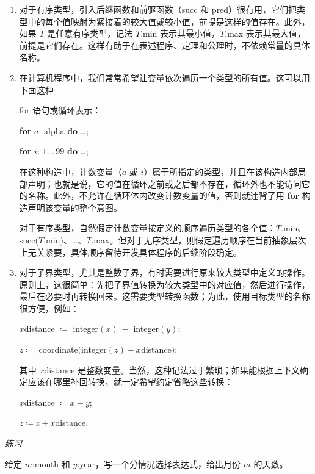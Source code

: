 \begin{enumerate}[wide, nosep, label=(\arabic*)]
	\quad \textbf{if} May $\leqslant$ this month \& this month $\leqslant$ September \textbf{then}
	
	\qquad adopt summer timetables. 
	
	\noindent
	其他情况下，值的次序完全无关，对程序员没有意义。
	
	\item 对于有序类型，引入后继函数和前驱函数（succ 和 pred）很有用，它们把类型中的每个值映射为紧接着的较大值或较小值，前提是这样的值存在。此外，如果 $T$ 是任意有序类型，记法 $T$.min 表示其最小值，$T$.max 表示其最大值，前提是它们存在。这样有助于在表述程序、定理和公理时，不依赖常量的具体名称。
	\item 在计算机程序中，我们常常希望让变量依次遍历一个类型的所有值。这可以用下面这种
	
	for 语句或循环表示：
	
	\quad \textbf{for} $a$: alpha \textbf{do} \dots;
	
	\quad \textbf{for} $i$: $1\,.\,.\,99$ \textbf{do} \dots;
	
	\noindent
	在这种构造中，计数变量（$a$ 或 $i$）属于所指定的类型，并且在该构造内部局部声明；也就是说，它的值在循环之前或之后都不存在，循环外也不能访问它的名称。此外，不允许在循环体内改变计数变量的值，否则就违背了用 \textbf{for} 构造声明该变量的整个意图。
	
	对于有序类型，自然假定计数变量按定义的顺序遍历类型的各个值：$T.$min、succ($T.$min)、\dots、$T.$max。但对于无序类型，则假定遍历顺序在当前抽象层次上无关紧要，具体顺序留待开发具体程序的后续阶段确定。
	
	\item 对于子界类型，尤其是整数子界，有时需要进行原来较大类型中定义的操作。原则上，这很简单：先把子界值转换为较大类型中的对应值，然后进行操作，最后在必要时再转换回来。这需要类型转换函数；为此，使用目标类型的名称很方便，例如：
	
	\quad $x$distance $\coloneq$ integer$(x)\ -$ integer$(y)$;
	
	\quad $z \coloneq$ coordinate$($integer$(z) + x$distance$)$;
	
	\noindent
	其中 $x$distance 是整数变量。当然，这种记法过于繁琐；如果能根据上下文确定应该在哪里补回转换，就一定希望约定省略这些转换：
	
	$x$distance $\coloneq x - y$;
	
	$z \coloneq z + x$distance.
\end{enumerate}

\noindent
\textit{练习}

\noindent
给定 $m$:month 和 $y$:year，写一个分情况选择表达式，给出月份 $m$ 的天数。

